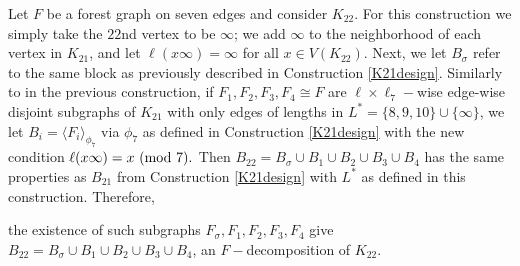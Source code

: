 \begin{construction}\label{K22design}
    Let $F$ be a forest graph on seven edges and consider $K_{22}$. For this construction we simply take the $22$nd vertex to be $\infty$; we add $\infty$ to the neighborhood of each vertex in $K_{21}$, and let $\ell(x\infty)=\infty$ for all $x\in V(K_{22})$. Next, we let $B_{\sigma}$ refer to the same block as previously described in Construction \ref{K21design}. Similarly to in the previous construction, if $F_{1},F_{2},F_{3},F_{4}\cong F$ are $\ell\times \ell_{7}-$wise edge-wise disjoint subgraphs of $K_{21}$ with only edges of lengths in $L^{*}=\{8,9,10\}\cup \{\infty\}$, we let $B_{i}=\langle F_{i}\rangle_{\phi_{7}}$ via $\phi_{7}$ as defined in Construction \ref{K21design} with the new condition $\ell(x\infty)=x\ (\mathrm{mod}\ 7).$ Then $B_{22}=B_{\sigma}\cup B_{1}\cup B_{2}\cup B_{3}\cup B_{4}$ has the same properties as $B_{21}$ from Construction \ref{K21design} with $L^{*}$ as defined in this construction.
    Therefore,

    \begin{center}
    the existence of such subgraphs $F_{\sigma},F_{1},F_{2},F_{3},F_{4}$ give $B_{22}=B_{\sigma}\cup B_{1}\cup B_{2}\cup B_{3}\cup B_{4}$, an $F-$decomposition of $K_{22}.$
    \end{center}
\end{construction}
\newpage
